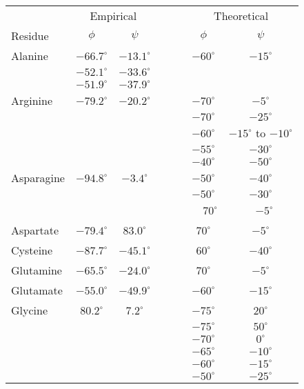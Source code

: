 \documentclass[12pt]{article}
\begin{document}
\begin{center}
\footnotesize
\begin{tabular}{lccccc}
&  \multicolumn{2}{c}{Empirical} & ~~~& \multicolumn{2}{c}{Theoretical}\\\cline{2-3}\cline{5-6}
Residue & $\phi$ & $\psi$ & & $\phi$ & $\psi$ \\
\hline Alanine   & $-66.7^{\circ}$ & $-13.1^{\circ}$ & & $-60^{\circ}$ & $-15^{\circ}$\\
                 & $-52.1^{\circ}$ & $-33.6^{\circ}$ & &\\
                 & $-51.9^{\circ}$ & $-37.9^{\circ}$ & &\\
Arginine        & $-79.2^{\circ}$ & $-20.2^{\circ}$ & & $-70^{\circ}$ & $-5^{\circ}$ \\
		 &	&	& & $-70^{\circ}$ & $-25^{\circ}$\\
		 &	&	& & $-60^{\circ}$ & $-15^{\circ}$ to $-10^{\circ}$\\
		 &	&	& & $-55^{\circ}$ & $-30^{\circ}$\\
                 &      &       & & $-40^{\circ}$ & $-50^{\circ}$\\      
Asparagine       & $-94.8^{\circ}$ & $-3.4^{\circ}$ & & $-50^{\circ}$ & $-40^{\circ}$ \\
                 &      &       & & $-50^{\circ}$ & $-30^{\circ}$\\
		 &      &       & & $\phantom{-}70^{\circ}$ & ~\,$-5^{\circ}$\\
Aspartate    & $-79.4^{\circ}$ & $83.0^{\circ}$ & & $70^{\circ}$ & $-5^{\circ}$ \\
Cysteine        & $-87.7^{\circ}$ & $-45.1^{\circ}$ & & $60^{\circ}$ & $-40^{\circ}$ \\
Glutamine      & $-65.5^{\circ}$ & $-24.0^{\circ}$ & & $70^{\circ}$ & $-5^{\circ}$\\
Glutamate     & $-55.0^{\circ}$ & $-49.9^{\circ}$ & & $-60^{\circ}$ & $-15^{\circ}$\\
Glycine          & $80.2^{\circ}$ & $7.2^{\circ}$ & & $-75^{\circ}$ & $20^{\circ}$  \\
                 &      &       & & $-75^{\circ}$ & $50^{\circ}$\\
                 &      &       & & $-70^{\circ}$ & $0^{\circ}$\\
                 &      &       & & $-65^{\circ}$ & $-10^{\circ}$\\
                 &      &       & & $-60^{\circ}$ & $-15^{\circ}$\\
                 &      &       & & $-50^{\circ}$ & $-25^{\circ}$\\

\end{tabular}
\end{center}
\end{document}

